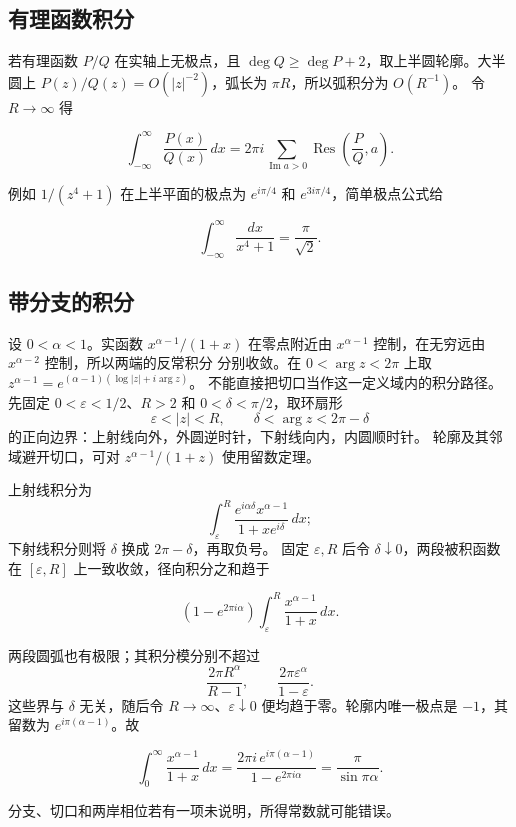 \subsection{有理函数积分}

若有理函数 \(P/Q\) 在实轴上无极点，且
\(\deg Q\ge\deg P+2\)，取上半圆轮廓。大半圆上
\(P(z)/Q(z)=O(|z|^{-2})\)，弧长为 \(\pi R\)，所以弧积分为 \(O(R^{-1})\)。
令 \(R\to\infty\) 得

\[
 \int_{-\infty}^{\infty}\frac{P(x)}{Q(x)}\,dx
 =2\pi i\sum_{\operatorname{Im}a>0}
 \operatorname{Res}\left(\frac P Q,a\right).
\]

例如 \(1/(z^4+1)\) 在上半平面的极点为
\(e^{i\pi/4}\) 和 \(e^{3i\pi/4}\)，简单极点公式给

\[
 \int_{-\infty}^{\infty}\frac{dx}{x^4+1}
 =\frac{\pi}{\sqrt2}.
\]

\subsection{带分支的积分}

设 \(0<\alpha<1\)。实函数 \(x^{\alpha-1}/(1+x)\) 在零点附近由
\(x^{\alpha-1}\) 控制，在无穷远由 \(x^{\alpha-2}\) 控制，所以两端的反常积分
分别收敛。在 \(0<\arg z<2\pi\) 上取
\(z^{\alpha-1}=e^{(\alpha-1)(\log|z|+i\arg z)}\)。
不能直接把切口当作这一定义域内的积分路径。先固定
\(0<\varepsilon<1/2\)、\(R>2\) 和 \(0<\delta<\pi/2\)，取环扇形
\[
 \varepsilon<|z|<R,\qquad \delta<\arg z<2\pi-\delta
\]
的正向边界：上射线向外，外圆逆时针，下射线向内，内圆顺时针。
轮廓及其邻域避开切口，可对 \(z^{\alpha-1}/(1+z)\) 使用留数定理。

上射线积分为
\[
 \int_\varepsilon^R
 \frac{e^{i\alpha\delta}x^{\alpha-1}}{1+xe^{i\delta}}\,dx;
\]
下射线积分则将 \(\delta\) 换成 \(2\pi-\delta\)，再取负号。
固定 \(\varepsilon,R\) 后令 \(\delta\downarrow0\)，两段被积函数在
\([\varepsilon,R]\) 上一致收敛，径向积分之和趋于

\[
 (1-e^{2\pi i\alpha})
 \int_\varepsilon^R\frac{x^{\alpha-1}}{1+x}\,dx.
\]

两段圆弧也有极限；其积分模分别不超过
\[
 \frac{2\pi R^\alpha}{R-1},\qquad
 \frac{2\pi\varepsilon^\alpha}{1-\varepsilon}.
\]
这些界与 \(\delta\) 无关，随后令 \(R\to\infty\)、\(\varepsilon\downarrow0\)
便均趋于零。轮廓内唯一极点是 \(-1\)，其留数为
\(e^{i\pi(\alpha-1)}\)。故

\[
 \int_0^\infty\frac{x^{\alpha-1}}{1+x}\,dx
 =\frac{2\pi i\,e^{i\pi(\alpha-1)}}{1-e^{2\pi i\alpha}}
 =\frac{\pi}{\sin\pi\alpha}.
\]

分支、切口和两岸相位若有一项未说明，所得常数就可能错误。

